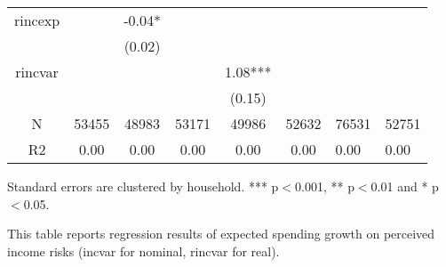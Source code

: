 \begin{table}[p]
\begin{adjustbox}{width={0.9\textwidth}}
\begin{threeparttable}
\begin{tabular}{ccccccll}
rincexp   &            &      -0.04* &              &               &                &                 &                  \\
          &            &      (0.02) &              &               &                &                 &                  \\
rincvar   &            &             &              &       1.08*** &                &                 &                  \\
          &            &             &              &        (0.15) &                &                 &                  \\
N         &      53455 &       48983 &        53171 &         49986 &          52632 &           76531 &            52751 \\
R2        &       0.00 &        0.00 &         0.00 &          0.00 &           0.00 &            0.00 &             0.00 \\
\bottomrule
\end{tabular}
\begin{tablenotes}\item Standard errors are clustered by household. *** p$<$0.001, ** p$<$0.01 and * p$<$0.05. 
\item This table reports regression results of expected spending growth on perceived income risks (incvar for nominal, rincvar for real).
\end{tablenotes}
\end{threeparttable}
\end{adjustbox}
\end{table}